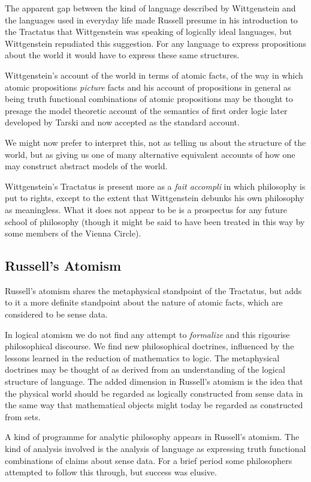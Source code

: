The apparent gap between the kind of language described by Wittgenstein and the languages used in everyday life made Russell presume in his introduction to the Tractatus that Wittgenstein was speaking of logically ideal languages, but Wittgenstein repudiated this suggestion.
For any language to express propositions about the world it would have to express these same structures.

Wittgenstein's account of the world in terms of atomic facts, of the way in which atomic propositions {\it picture} facts and his account of propositions in general as being truth functional combinations of atomic propositions may be thought to presage the model theoretic account of the semantics of first order logic later developed by Tarski and now accepted as the standard account.

We might now prefer to interpret this, not as telling us about the structure of the world, but as giving us one of many alternative equivalent accounts of how one may construct abstract models of the world.

Wittgenstein's Tractatus is present more as a {\it fait accompli} in which philosophy is put to rights, except to the extent that Wittgenstein debunks his own philosophy as meaningless.
What it does not appear to be is a prospectus for any future school of philosophy (though it might be said to have been treated in this way by some members of the Vienna Circle).

\subsection{Russell's Atomism}

Russell's atomism shares the metaphysical standpoint of the Tractatus, but adds to it a more definite standpoint about the nature of atomic facts, which are considered to be sense data.

In logical atomism we do not find any attempt to {\it formalize} and this rigourise philosophical discourse.
We find new philosophical doctrines, influenced by the lessons learned in the reduction of mathematics to logic.
The metaphysical doctrines may be thought of as derived from an understanding of the logical structure of language.
The added dimension in Russell's atomism is the idea that the physical world should be regarded as logically constructed from sense data in the same way that mathematical objects might today be regarded as constructed from sets.

A kind of programme for analytic philosophy appears in Russell's atomism.
The kind of analysis involved is the analysis of language as expressing truth functional combinations of claims about sense data.
For a brief period some philosophers attempted to follow this through, but success was elusive.

